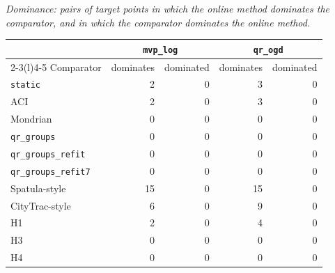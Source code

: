 \medskip
\textit{Dominance: pairs of target points in which the online method dominates the comparator, and in which the comparator dominates the online method.}
\smallskip

\setlength{\tabcolsep}{3pt}
\begin{tabular}{@{}lrrrr@{}}
\toprule
 & \multicolumn{2}{c}{\texttt{mvp\_log}} & \multicolumn{2}{c}{\texttt{qr\_ogd}} \\
\cmidrule(lr){2-3}\cmidrule(l){4-5}
Comparator & dominates & dominated & dominates & dominated \\
\midrule
\texttt{static} & 2 & 0 & 3 & 0 \\
ACI & 2 & 0 & 3 & 0 \\
Mondrian & 0 & 0 & 0 & 0 \\
\texttt{qr\_groups} & 0 & 0 & 0 & 0 \\
\texttt{qr\_groups\_refit} & 0 & 0 & 0 & 0 \\
\texttt{qr\_groups\_refit7} & 0 & 0 & 0 & 0 \\
Spatula-style & 15 & 0 & 15 & 0 \\
CityTrac-style & 6 & 0 & 9 & 0 \\
H1 & 2 & 0 & 4 & 0 \\
H3 & 0 & 0 & 0 & 0 \\
H4 & 0 & 0 & 0 & 0 \\
\bottomrule
\end{tabular}
